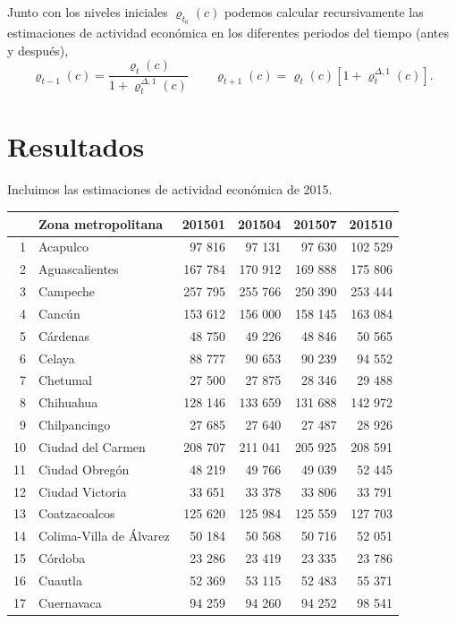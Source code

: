 \documentclass[]{article}
\begin{document}
Junto con los niveles iniciales \(\varrho_{t_0}(c)\) podemos calcular
recursivamente las estimaciones de actividad económica en los diferentes
periodos del tiempo (antes y después),
\[ \varrho_{t-1}(c) = \frac{\varrho_t(c)}{1 + \varrho_t^{\Delta,1}(c)} \qquad
      \varrho_{t+1}(c) = \varrho_t(c)[1 + \varrho_t^{\Delta,1}(c)].\]

\section{Resultados}\label{resultados}

Incluimos las estimaciones de actividad económica de 2015.

\begin{table}[H]
\centering
\begingroup\scriptsize
\begin{tabular}{rlrrrr}
  \hline
 & Zona metropolitana & 201501 & 201504 & 201507 & 201510 \\ 
  \hline
1 & Acapulco & 97 816 & 97 131 & 97 630 & 102 529 \\ 
  2 & Aguascalientes & 167 784 & 170 912 & 169 888 & 175 806 \\ 
  3 & Campeche & 257 795 & 255 766 & 250 390 & 253 444 \\ 
  4 & Cancún & 153 612 & 156 000 & 158 145 & 163 084 \\ 
  5 & Cárdenas & 48 750 & 49 226 & 48 846 & 50 565 \\ 
  6 & Celaya & 88 777 & 90 653 & 90 239 & 94 552 \\ 
  7 & Chetumal & 27 500 & 27 875 & 28 346 & 29 488 \\ 
  8 & Chihuahua & 128 146 & 133 659 & 131 688 & 142 972 \\ 
  9 & Chilpancingo & 27 685 & 27 640 & 27 487 & 28 926 \\ 
  10 & Ciudad del Carmen & 208 707 & 211 041 & 205 925 & 208 591 \\ 
  11 & Ciudad Obregón & 48 219 & 49 766 & 49 039 & 52 445 \\ 
  12 & Ciudad Victoria & 33 651 & 33 378 & 33 806 & 33 791 \\ 
  13 & Coatzacoalcos & 125 620 & 125 984 & 125 559 & 127 703 \\ 
  14 & Colima-Villa de Álvarez & 50 184 & 50 568 & 50 716 & 52 051 \\ 
  15 & Córdoba & 23 286 & 23 419 & 23 335 & 23 786 \\ 
  16 & Cuautla & 52 369 & 53 115 & 52 483 & 55 371 \\ 
  17 & Cuernavaca & 94 259 & 94 260 & 94 252 & 98 541 \\ 

\end{tabular}
\end{table}
\end{document}
